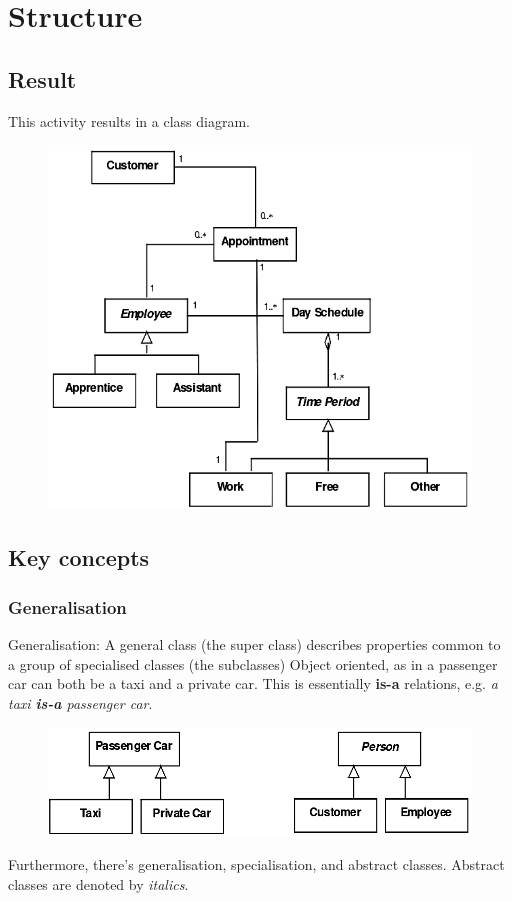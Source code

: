 \section{Structure}
\subsection{Result}
This activity results in a class diagram.
\begin{figure}[H]
    \centering
    \includegraphics[width=.6\textwidth]{figures/classdiagram.png}
\end{figure}
\subsection{Key concepts}
\subsubsection{Generalisation}
Generalisation: A general class (the super class) describes properties common to a group of specialised classes (the subclasses)
Object oriented, as in a passenger car can both be a taxi and a private car. This is essentially \textbf{is-a} relations, e.g. \textit{a taxi \textbf{is-a} passenger car}. 

\begin{figure}[H]
    \centering
    \includegraphics[scale=1.5]{figures/generalisation.png}
\end{figure}

Furthermore, there's generalisation, specialisation, and abstract classes. Abstract classes are denoted by \textit{italics}.

